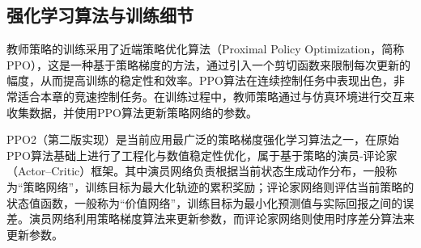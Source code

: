 \subsection{强化学习算法与训练细节}
教师策略的训练采用了近端策略优化算法（Proximal Policy Optimization，简称PPO）\cite{schulman2017proximal}，这是一种基于策略梯度的方法，通过引入一个剪切函数来限制每次更新的幅度，从而提高训练的稳定性和效率。PPO算法在连续控制任务中表现出色，非常适合本章的竞速控制任务。在训练过程中，教师策略通过与仿真环境进行交互来收集数据，并使用PPO算法更新策略网络的参数。

PPO2（第二版实现）是当前应用最广泛的策略梯度强化学习算法之一，在原始PPO算法基础上进行了工程化与数值稳定性优化，属于基于策略的演员-评论家（Actor–Critic）框架\cite{konda1999actor}。其中演员网络负责根据当前状态生成动作分布，一般称为“策略网络”，训练目标为最大化轨迹的累积奖励；评论家网络则评估当前策略的状态值函数，一般称为“价值网络”，训练目标为最小化预测值与实际回报之间的误差。演员网络利用策略梯度算法\cite{sutton1999policy}来更新参数，而评论家网络则使用时序差分算法\cite{sutton1998reinforcement}来更新参数。

